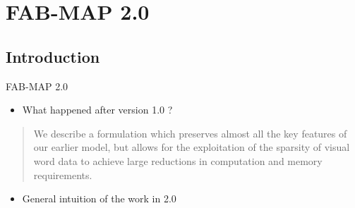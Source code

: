 \section{FAB-MAP 2.0}

\subsection{Introduction}
\begin{frame}{FAB-MAP 2.0}
    \begin{itemize}
        \item What happened after version 1.0 ?
    \end{itemize}
    \begin{quotation}
        We describe a formulation which preserves almost all the key features of our earlier model, but allows for the exploitation of the sparsity of visual word data to achieve large reductions in computation and memory requirements.~\cite{fabmap2011}
    \end{quotation}
    \begin{itemize}
        \item General intuition of the work in 2.0
    \end{itemize}
\end{frame}

